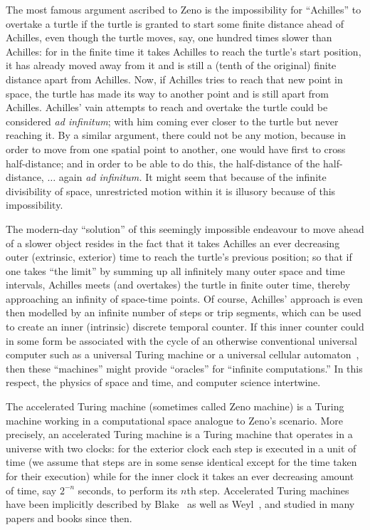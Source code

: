 \documentclass[12pt]{article}
\begin{document}
The most famous argument ascribed to Zeno is the impossibility for ``Achilles'' to overtake a turtle if the turtle is granted
to start some finite distance ahead of Achilles, even though the turtle moves, say, one hundred times slower than Achilles:
for in the finite time it takes Achilles to reach the turtle's start position, it has already moved away from it and is still a
(tenth of the original) finite distance apart from Achilles. Now, if Achilles tries to reach that new point in space, the turtle
has made its way to another point and is still apart from Achilles.
Achilles' vain attempts to reach and overtake the turtle could be considered {\it ad infinitum}; with him coming ever closer to the
turtle but never reaching it.
By a similar argument, there could not be any motion, because in order to move from one spatial point to another,
one would have first to cross half-distance; and in order to be able to do this, the half-distance of the
half-distance, $\ldots$ again {\it ad infinitum.}
It might seem that because of the infinite divisibility of space, unrestricted motion within it is illusory because of this impossibility.

The modern-day ``solution'' of this seemingly impossible endeavour to move ahead of a slower object
resides in the fact that it takes Achilles an ever decreasing outer (extrinsic, exterior) time to reach
the turtle's previous position; so that if one takes ``the limit''
by summing up all infinitely many outer space and time intervals,
Achilles meets (and overtakes) the turtle in finite outer time,
thereby approaching an infinity of space-time points.
Of course, Achilles' approach is even then modelled by an infinite number of steps or trip segments,
which can be used to create an inner (intrinsic) discrete temporal counter.
If this inner counter could in some form be associated with the cycle of an otherwise conventional universal computer such as a universal
Turing machine or a universal cellular automaton~\cite{zuse-67,wolfram-2002},
then these ``machines'' might provide ``oracles'' for ``infinite computations.''
In this respect, the physics of space and time, and computer science intertwine.

The  accelerated Turing machine (sometimes called Zeno machine) is a Turing machine working in a
 computational space analogue to Zeno's scenario.  More precisely, an
accelerated Turing machine  is a Turing
machine that operates in a universe with two clocks:
for  the exterior clock each step is executed in a unit of time (we assume that steps are in some sense identical except for the time
taken for their execution) while for
the inner clock it takes an ever decreasing amount of time, say $2^{-n}$ seconds,  to perform its $n$th step.
Accelerated Turing machines have been implicitly described by Blake~\cite[p.~651]{Blake26} as well as Weyl~\cite[pp.~41-42]{weyl:49},
and studied in many papers and books since then.
\end{document}
